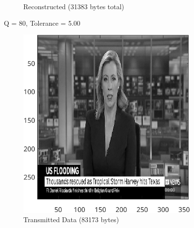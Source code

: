 \documentclass{article}
\begin{document}
\begin{figure}[ht]
\begin{subfigure}[t]{0.45\textwidth}
			\caption{Reconstructed (31383 bytes total)}
			\label{fig:2B_Input4Reconstructed}

		\end{subfigure}

		\caption{Q = 80, Tolerance = 5.00}
		\label{fig:2B_Input4}
	\end{figure}


		\begin{figure}[ht]
		\centering
			\begin{subfigure}[t]{0.45\textwidth}
			\centering

			\includegraphics[width=\textwidth]{2B_Input5TD}

			\caption{Transmitted Data (83173 bytes)}
			\label{fig:2B_Input5TD}

		\end{subfigure}
		\hspace{1cm}
		\begin{subfigure}[t]{0.45\textwidth}
			\centering


\end{subfigure}
\end{figure}
\end{document}
